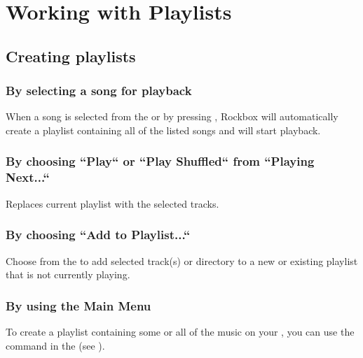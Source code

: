 \section{\label{ref:working_with_playlists}Working with Playlists}

\subsection{Creating playlists}

\subsubsection{By selecting a song for playback}
When a song is selected from the  or  by pressing
\ActionTreeEnter, Rockbox will automatically create a playlist containing all of the
listed songs and will start playback.


\subsubsection{By choosing ``Play`` or ``Play Shuffled`` from ``Playing Next...``}
Replaces current playlist with the selected tracks.

\subsubsection{\label{ref:addtoplaylist_submenu}By choosing  ``Add to Playlist...``}
Choose  from the  to
add selected track(s) or directory to a new or existing playlist that is not currently
playing.


\subsubsection{By using the Main Menu}
To create a playlist containing some or all of the music on your \dap{}, you can use the
 command in the 
(see ).

